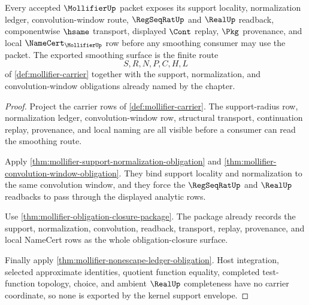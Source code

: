 \begin{theorem}
\label{thm:mollifier-kernel-support-envelope}
Every accepted $\MollifierUp$ packet exposes its support locality, normalization ledger, convolution-window route, $\RegSeqRatUp$ and $\RealUp$ readback, componentwise $\hsame$ transport, displayed $\Cont$ replay, $\Pkg$ provenance, and local $\NameCert_{\MollifierUp}$ row before any smoothing consumer may use the packet. The exported smoothing surface is the finite route
$$
S,R,N,P,C,H,L
$$
of \autoref{def:mollifier-carrier} together with the support, normalization, and convolution-window obligations already named by the chapter.
\end{theorem}
\begin{proof}
Project the carrier rows of \autoref{def:mollifier-carrier}. The support-radius row, normalization ledger, convolution-window row, structural transport, continuation replay, provenance, and local naming are all visible before a consumer can read the smoothing route.

Apply \autoref{thm:mollifier-support-normalization-obligation} and \autoref{thm:mollifier-convolution-window-obligation}. They bind support locality and normalization to the same convolution window, and they force the $\RegSeqRatUp$ and $\RealUp$ readbacks to pass through the displayed analytic rows.

Use \autoref{thm:mollifier-obligation-closure-package}. The package already records the support, normalization, convolution, readback, transport, replay, provenance, and local NameCert rows as the whole obligation-closure surface.

Finally apply \autoref{thm:mollifier-nonescape-ledger-obligation}. Host integration, selected approximate identities, quotient function equality, completed test-function topology, choice, and ambient $\RealUp$ completeness have no carrier coordinate, so none is exported by the kernel support envelope.
\end{proof}

